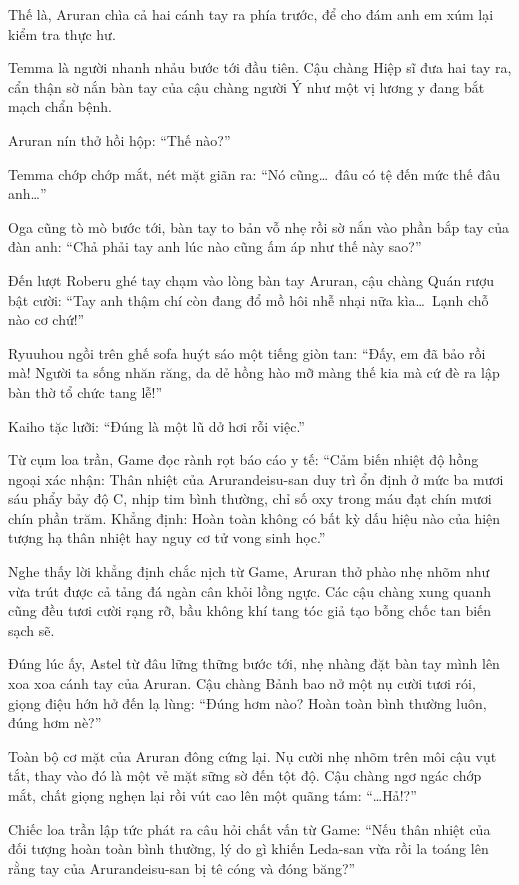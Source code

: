 \documentclass[../main.tex]{subfiles}
\begin{document}
Thế là, Aruran chìa cả hai cánh tay ra phía trước, để cho đám anh em xúm lại kiểm tra thực hư.

Temma là người nhanh nhảu bước tới đầu tiên. Cậu chàng Hiệp sĩ đưa hai tay ra, cẩn thận sờ nắn bàn tay của cậu chàng người Ý như một vị lương y đang bắt mạch chẩn bệnh.

Aruran nín thở hồi hộp: ``Thế nào?''

Temma chớp chớp mắt, nét mặt giãn ra: ``Nó cũng\dots\ đâu có tệ đến mức thế đâu anh\dots''

Oga cũng tò mò bước tới, bàn tay to bản vỗ nhẹ rồi sờ nắn vào phần bắp tay của đàn anh: ``Chả phải tay anh lúc nào cũng ấm áp như thế này sao?''

Đến lượt Roberu ghé tay chạm vào lòng bàn tay Aruran, cậu chàng Quán rượu bật cười: ``Tay anh thậm chí còn đang đổ mồ hôi nhễ nhại nữa kìa\dots\ Lạnh chỗ nào cơ chứ!''

Ryuuhou ngồi trên ghế sofa huýt sáo một tiếng giòn tan: ``Đấy, em đã bảo rồi mà! Người ta sống nhăn răng, da dẻ hồng hào mỡ màng thế kia mà cứ đè ra lập bàn thờ tổ chức tang lễ!''

Kaiho tặc lưỡi: ``Đúng là một lũ dở hơi rỗi việc.''

Từ cụm loa trần, Game đọc rành rọt báo cáo y tế: ``Cảm biến nhiệt độ hồng ngoại xác nhận: Thân nhiệt của Arurandeisu-san duy trì ổn định ở mức ba mươi sáu phẩy bảy độ C, nhịp tim bình thường, chỉ số oxy trong máu đạt chín mươi chín phần trăm. Khẳng định: Hoàn toàn không có bất kỳ dấu hiệu nào của hiện tượng hạ thân nhiệt hay nguy cơ tử vong sinh học.''

Nghe thấy lời khẳng định chắc nịch từ Game, Aruran thở phào nhẹ nhõm như vừa trút được cả tảng đá ngàn cân khỏi lồng ngực. Các cậu chàng xung quanh cũng đều tươi cười rạng rỡ, bầu không khí tang tóc giả tạo bỗng chốc tan biến sạch sẽ.

Đúng lúc ấy, Astel từ đâu lững thững bước tới, nhẹ nhàng đặt bàn tay mình lên xoa xoa cánh tay của Aruran. Cậu chàng Bảnh bao nở một nụ cười tươi rói, giọng điệu hớn hở đến lạ lùng: ``Đúng hơm nào? Hoàn toàn bình thường luôn, đúng hơm nè?''

Toàn bộ cơ mặt của Aruran đông cứng lại. Nụ cười nhẹ nhõm trên môi cậu vụt tắt, thay vào đó là một vẻ mặt sững sờ đến tột độ. Cậu chàng ngơ ngác chớp mắt, chất giọng nghẹn lại rồi vút cao lên một quãng tám: ``\dots Hả!?''


Chiếc loa trần lập tức phát ra câu hỏi chất vấn từ Game: ``Nếu thân nhiệt của đối tượng hoàn toàn bình thường, lý do gì khiến Leda-san vừa rồi la toáng lên rằng tay của Arurandeisu-san bị tê cóng và đóng băng?''
\end{document}

